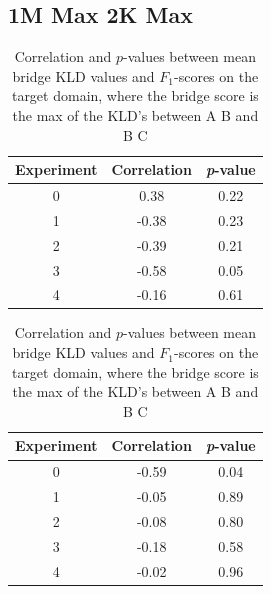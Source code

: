 \documentclass[11pt,a4paper]{article}
\begin{document}
\subsection*{\centering 1M Max \hspace{150} 2K Max}
\begin{table}[h]
\centering
    \begin{tabular}{|c|c|c|}
    \hline
     \textbf{Experiment} & \textbf{Correlation} & \textbf{\textit{p}-value} \\ \hline
     0 & 0.38 & 0.22 \\ \hline
     1 & -0.38& 0.23 \\ \hline
     2 & -0.39 & 0.21 \\ \hline
     3 & -0.58 & 0.05 \\ \hline
     4 & -0.16 & 0.61 \\ \hline
    \end{tabular}
\hspace{2em}
    \begin{tabular}{|c|c|c|}
    \hline
     \textbf{Experiment} & \textbf{Correlation} & \textbf{\textit{p}-value} \\ \hline
     0 & -0.59 & 0.04 \\ \hline
     1 & -0.05 & 0.89 \\ \hline
     2 & -0.08 & 0.80 \\ \hline
     3 & -0.18 & 0.58 \\ \hline
     4 & -0.02 & 0.96 \\ \hline
    \end{tabular}
\caption{Correlation and $p$-values between mean bridge KLD values and $F_1$-scores on the target domain, where the bridge score is the max of the KLD's between A \textrightarrow B and B \textrightarrow C}
\end{table}
\end{document}
